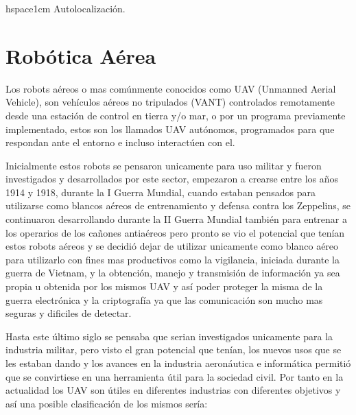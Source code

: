 hspace{1cm} Autolocalización.


\section{Robótica Aérea}
\hspace{1cm} Los robots aéreos o mas comúnmente conocidos como UAV (Unmanned Aerial Vehicle), son vehículos aéreos no tripulados (VANT) controlados remotamente desde una estación de control en tierra y/o mar, o por un programa previamente implementado, estos son los llamados UAV autónomos, programados para que respondan ante el entorno e incluso interactúen con el.

\hspace{1cm} Inicialmente estos robots se pensaron unicamente para uso militar y fueron investigados y desarrollados por este sector, empezaron a crearse entre los años 1914 y 1918, durante la I Guerra Mundial, cuando estaban pensados para utilizarse como blancos aéreos de entrenamiento y defensa contra los Zeppelins, se continuaron desarrollando durante la II Guerra Mundial también para entrenar a los operarios de los cañones antiaéreos pero pronto se vio el potencial que tenían estos robots aéreos y se decidió dejar de utilizar unicamente como blanco aéreo para utilizarlo con fines mas productivos como la vigilancia, iniciada durante la guerra de Vietnam,  y la obtención, manejo y transmisión de información ya sea propia u obtenida por los mismos UAV y así poder proteger la misma de la guerra electrónica y la criptografía ya que las comunicación son mucho mas seguras y dificiles de detectar.

\hspace{1cm} Hasta este último siglo se pensaba que serian investigados unicamente para la industria militar, pero visto el gran potencial que tenían, los nuevos usos que se les estaban dando y los avances en  la industria aeronáutica e informática permitió que se convirtiese en una herramienta útil para la sociedad civil. Por tanto en la actualidad los UAV son útiles en diferentes industrias con diferentes objetivos y así una posible clasificación de los mismos sería:

